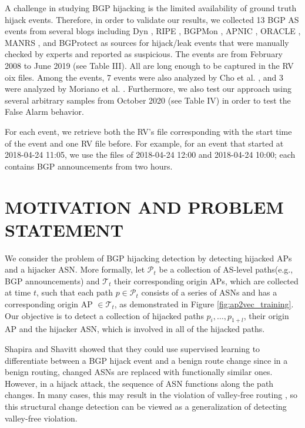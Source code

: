 \documentclass[10pt,journal]{IEEEtran}
\begin{document}
A challenge in studying BGP hijacking is the limited availability of ground truth hijack events. Therefore, in order to validate our results, we collected 13 BGP AS events from several blogs including Dyn \cite{dyn}, RIPE \cite{ripe}, BGPMon \cite{bgpmon}, APNIC \cite{apnic}, ORACLE \cite{oracle}, MANRS \cite{manrs}, and BGProtect \cite{bgprotect} as sources for hijack/leak events that were manually checked by experts and reported as suspicious. The events are from February 2008 to June 2019 (see Table III). All are long enough to be captured in the RV oix files. Among the events, 7 events were also analyzed by Cho et al. \cite{cho2019bgp}, and 3 were analyzed by Moriano et al. \cite{moriano2021using}. Furthermore, we also test our approach using several arbitrary samples from October 2020 (see Table IV) in order to test the False Alarm behavior.

For each event, we retrieve both the RV's file corresponding with the start time of the event and one RV file before. For example, for an event that started at 2018-04-24 11:05, we use the files of 2018-04-24 12:00 and 2018-04-24 10:00; each contains BGP announcements from two hours.

\section{MOTIVATION AND PROBLEM STATEMENT}
We consider the problem of BGP hijacking detection by detecting hijacked APs and a hijacker ASN. More formally, let $\mathcal{P}_{t}$ be a collection of AS-level paths(e.g., BGP announcements) and $\mathcal{T}_{t}$ their corresponding origin APs, which are collected at time $t$, such that each path $p \in \mathcal{P}_{t}$ consists of a series of ASNs and has a corresponding origin AP $\in \mathcal{T}_{t}$, as demonstrated in Figure \ref{fig:ap2vec_training}. Our objective is to detect a collection of hijacked paths $p_{i},\ldots,p_{1+l}$, their origin AP and the hijacker ASN, which is involved in all of the hijacked paths.

Shapira and Shavitt \cite{shapira2020deep} showed that they could use supervised learning to differentiate between a BGP hijack event and a benign route change since in a benign routing, changed ASNs are replaced with functionally similar ones. However, in a hijack attack, the sequence of ASN functions along the path changes. In many cases, this may result in the violation of valley-free routing \cite{gao2001inferring}, so this structural change detection can be viewed as a generalization of detecting valley-free violation.
\end{document}
